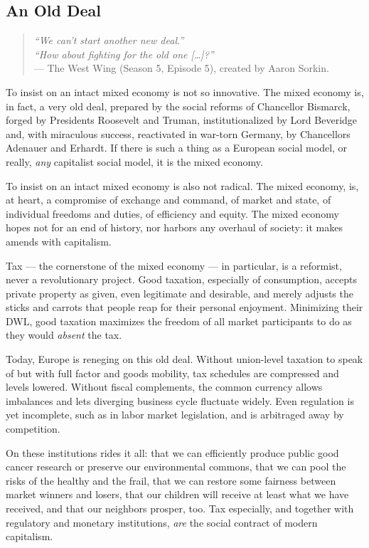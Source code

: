 \subsection[An Old Deal]{An Old Deal} %

\begin{quote}
	\emph{``We can't start another new deal.''\\
	``How about fighting for the old one [\ldots]?''\\}
	 --- The West Wing (Season 5, Episode 5), created by Aaron Sorkin.
\end{quote}

To insist on an intact mixed economy is not so innovative.
The mixed economy is, in fact, a very old deal, prepared by the social reforms of Chancellor Bismarck, forged by Presidents Roosevelt and Truman, institutionalized by Lord Beveridge and, with miraculous success, reactivated in war-torn Germany, by Chancellors Adenauer and Erhardt.
If there is such a thing as a European social model, or really, \emph{any} capitalist social model, it is the mixed economy.

To insist on an intact mixed economy is also not radical.
The mixed economy, is, at heart, a compromise of exchange and command, of market and state, of individual freedoms and duties, of efficiency and equity.
The mixed economy hopes not for an end of history, nor harbors any overhaul of society:
it makes amends with capitalism.

Tax --- the cornerstone of the mixed economy --- in particular, is a reformist, never a revolutionary project.
Good taxation, especially of consumption, accepts private property as given, even legitimate and desirable, and merely adjusts the sticks and carrots that people reap for their personal enjoyment.
Minimizing their \gls{DWL}, good taxation maximizes the freedom of all market participants to do as they would \emph{absent} the tax.

Today, Europe is reneging on this old deal.
Without union-level taxation to speak of but with full factor and goods mobility, tax schedules are compressed and levels lowered.
Without fiscal complements, the common currency allows imbalances and lets diverging business cycle fluctuate widely.
Even regulation is yet incomplete, such as in labor market legislation, and is arbitraged away by competition.

On these institutions rides it all:
that we can efficiently produce public good cancer research or preserve our environmental commons, that we can pool the risks of the healthy and the frail, that we can restore some fairness between market winners and losers, that our children will receive at least what we have received, and that our neighbors prosper, too.
Tax especially, and together with regulatory and monetary institutions, \emph{are} the social contract of modern capitalism.

